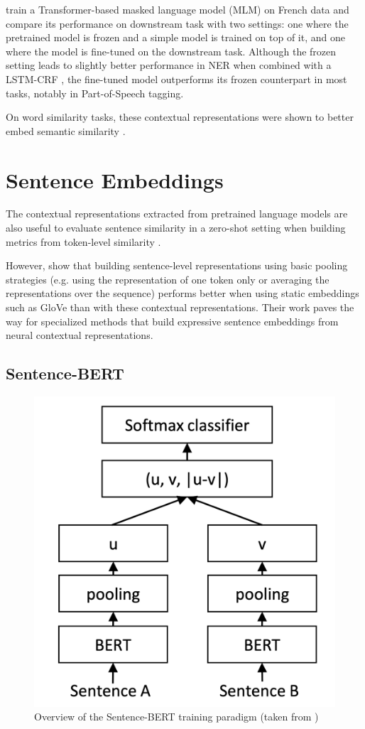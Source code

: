 \citet{martin-etal-2020-camembert} train a Transformer-based masked language model (MLM) on French data and compare its performance on downstream task with two settings: one where the pretrained model is frozen and a simple model is trained on top of it, and one where the model is fine-tuned on the downstream task. Although the frozen setting leads to slightly better performance in NER when combined with a LSTM-CRF \citep{panchendrarajan-amaresan-2018-bidirectional}, the fine-tuned model outperforms its frozen counterpart in most tasks, notably in Part-of-Speech tagging.

On word similarity tasks, these contextual representations were shown to better embed semantic similarity \citep{bommasani-etal-2020-interpreting}.



\section{Sentence Embeddings}
\label{sec:rw_sent_embs}
The contextual representations extracted from pretrained language models are also useful to evaluate sentence similarity in a zero-shot setting when building metrics from token-level similarity \citep{Zhang2020BERTScore}. 

However, \citet{reimers-gurevych-2019-sentence} show that building sentence-level representations using basic pooling strategies (e.g. using the representation of one token only or averaging the representations over the sequence) performs better when using static embeddings such as GloVe than with these contextual representations. Their work paves the way for specialized methods that build expressive sentence embeddings from neural contextual representations.

\subsection{Sentence-BERT}
\begin{figure}[ht]
  \centering
  \includegraphics[width=0.3\linewidth]{sources/related_works/imgs/sbert.png}
  \caption{Overview of the Sentence-BERT training paradigm (taken from \citet{reimers-gurevych-2019-sentence})}
  \label{fig:sbert}
\end{figure}

